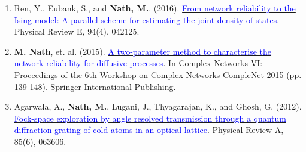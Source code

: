 \begin{enumerate}
\item
Ren, Y., Eubank, S., and {\textbf{Nath, M.}}. (2016).
{\href{https://journals.aps.org/pre/abstract/10.1103/PhysRevE.94.042125}{\textcolor{blue}{
From network reliability to the Ising model: A parallel scheme for estimating the joint density of states}}}. Physical Review E, 94(4), 042125. {\label{ising}}

\item
{\textbf{M. Nath}}, et. al. (2015). 
{\href{https://link.springer.com/chapter/10.1007/978-3-319-16112-9_14}{\textcolor{blue}{
A two-parameter method to characterise the network reliability for diffusive processes}}}. In Complex Networks VI: Proceedings of the 6th Workshop on Complex Networks CompleNet 2015 (pp. 139-148). Springer International Publishing.

\item
Agarwala, A., {\textbf{Nath, M.}}, Lugani, J., Thyagarajan, K., and Ghosh, G. (2012).
{\href{https://journals.aps.org/pra/abstract/10.1103/PhysRevA.85.063606}{\textcolor{blue}{
Fock-space exploration by angle resolved transmission through a quantum diffraction grating of cold atoms in an optical lattice}}}. Physical Review A, 85(6), 063606.
{\label{msc}}
\end{enumerate}